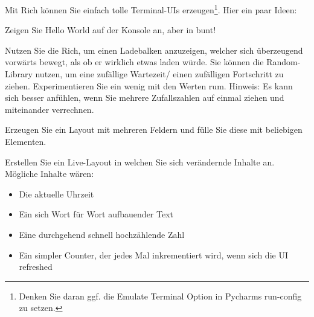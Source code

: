 \documentclass{config/minimal_uebungszettel}
\theoremstyle{definition}
\begin{document}
	
		\newpage
		\begin{aufg}[Rich] \quad
			  Mit Rich können Sie einfach tolle Terminal-UIs erzeugen\footnote{Denken Sie daran ggf. die Emulate Terminal Option in Pycharms run-config zu setzen.}. 
			  \newline
			  Hier ein paar Ideen:\newline
			  
			  \noindent {} \quad
			  
			  \noindent Zeigen Sie Hello World auf der Konsole an, aber in bunt!
			  
			  	\medskip
			  \medskip
			  
			  \noindent {} \quad
			  
			  \noindent Nutzen Sie die Rich, um einen Ladebalken anzuzeigen, welcher sich überzeugend vorwärts bewegt, als ob er wirklich etwas laden würde. Sie können die Random-Library nutzen, um eine zufällige Wartezeit/ einen zufälligen Fortschritt zu ziehen. Experimentieren Sie ein wenig mit den Werten rum.\newline
			  Hinweis: Es kann sich besser anfühlen, wenn Sie mehrere Zufallszahlen auf einmal ziehen und miteinander verrechnen.
			  
			  	\medskip
			  \medskip
			  
			  \noindent {} \quad
			  
			  \noindent Erzeugen Sie ein Layout mit mehreren Feldern und fülle Sie diese mit beliebigen Elementen.
			  
			  
			  	\medskip
			  \medskip
			  
  			  \noindent {} \quad
			  
			  Erstellen Sie ein Live-Layout in welchen Sie sich verändernde Inhalte an.\newline
			  Mögliche Inhalte wären:
			  \begin{itemize}
			  	    \item Die aktuelle Uhrzeit
			  	    \item Ein sich Wort für Wort aufbauender Text
			  		\item Eine durchgehend schnell hochzählende Zahl
			  		\item Ein simpler Counter, der jedes Mal inkrementiert wird, wenn sich die UI refreshed
			  \end{itemize}
			  
			  	\medskip
			  \medskip
			  
			  \noindent {} \quad
			  

\end{aufg}
\end{document}
